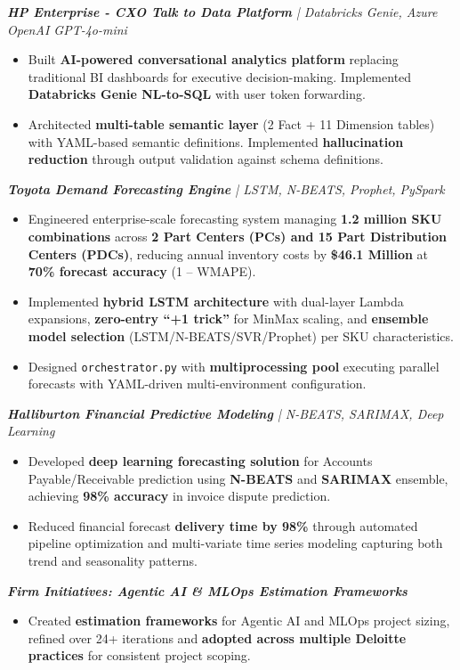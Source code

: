 \documentclass[letterpaper,10pt]{article}
\newcommand{\resumeItem}[1]{
  \item\small{
    {#1 \vspace{-2pt}}
  }
}
\newcommand{\resumeItemListStart}{\begin{itemize}}
\newcommand{\resumeItemListEnd}{\end{itemize}\vspace{-5pt}}
\begin{document}
      \vspace{12pt}
      \textit{\small\textbf{HP Enterprise - CXO Talk to Data Platform} | Databricks Genie, Azure OpenAI GPT-4o-mini}
      \resumeItemListStart
        \resumeItem{Built \textbf{AI-powered conversational analytics platform} replacing traditional BI dashboards for executive decision-making. Implemented \textbf{Databricks Genie NL-to-SQL} with user token forwarding.}
        \resumeItem{Architected \textbf{multi-table semantic layer} (2 Fact + 11 Dimension tables) with YAML-based semantic definitions. Implemented \textbf{hallucination reduction} through output validation against schema definitions.}
      \resumeItemListEnd

      \vspace{12pt}
      \textit{\small\textbf{Toyota Demand Forecasting Engine} | LSTM, N-BEATS, Prophet, PySpark}
      \resumeItemListStart
        \resumeItem{Engineered enterprise-scale forecasting system managing \textbf{1.2 million SKU combinations} across \textbf{2 Part Centers (PCs) and 15 Part Distribution Centers (PDCs)}, reducing annual inventory costs by \textbf{\$46.1 Million} at \textbf{70\% forecast accuracy} (1 -- WMAPE).}
        \resumeItem{Implemented \textbf{hybrid LSTM architecture} with dual-layer Lambda expansions, \textbf{zero-entry ``+1 trick''} for MinMax scaling, and \textbf{ensemble model selection} (LSTM/N-BEATS/SVR/Prophet) per SKU characteristics.}
        \resumeItem{Designed \texttt{orchestrator.py} with \textbf{multiprocessing pool} executing parallel forecasts with YAML-driven multi-environment configuration.}
      \resumeItemListEnd

      \vspace{12pt}
      \textit{\small\textbf{Halliburton Financial Predictive Modeling} | N-BEATS, SARIMAX, Deep Learning}
      \resumeItemListStart
        \resumeItem{Developed \textbf{deep learning forecasting solution} for Accounts Payable/Receivable prediction using \textbf{N-BEATS} and \textbf{SARIMAX} ensemble, achieving \textbf{98\% accuracy} in invoice dispute prediction.}
        \resumeItem{Reduced financial forecast \textbf{delivery time by 98\%} through automated pipeline optimization and multi-variate time series modeling capturing both trend and seasonality patterns.}
      \resumeItemListEnd

      \vspace{12pt}
      \textit{\small\textbf{Firm Initiatives: Agentic AI \& MLOps Estimation Frameworks}}
      \resumeItemListStart
        \resumeItem{Created \textbf{estimation frameworks} for Agentic AI and MLOps project sizing, refined over 24+ iterations and \textbf{adopted across multiple Deloitte practices} for consistent project scoping.}
      \resumeItemListEnd
\end{document}
